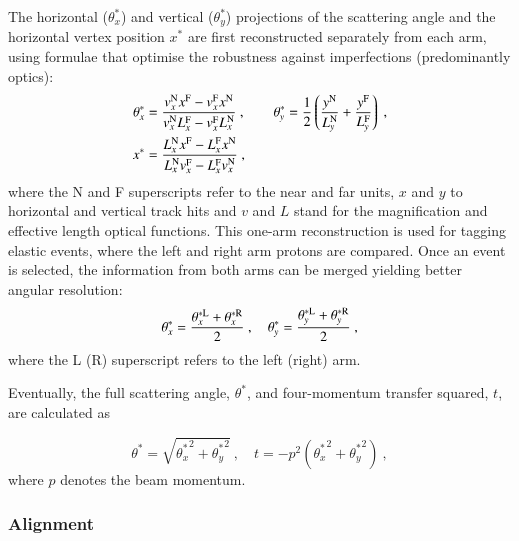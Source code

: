 The horizontal ($\theta_x^*$) and vertical ($\theta_y^*$) projections of the scattering angle and the horizontal vertex position $x^*$ are first reconstructed separately from each arm, using formulae that optimise the robustness against imperfections (predominantly optics):
\begin{equation}
\label{eq:kin 1a}
	\begin{aligned}
		\theta_x^* &= {v_x^{\rm N} x^{\rm F} - v_x^{\rm F} x^{\rm N}\over v_x^{\rm N} L_x^{\rm F} - v_x^{\rm F} L_x^{\rm N}}\ ,\qquad
		\theta_y^* = {1\over 2} \left( {y^{\rm N}\over L_y^{\rm N}} + {y^{\rm F}\over L_y^{\rm F}} \right)\ ,\\
		x^* &= {L_x^{\rm N} x^{\rm F} - L_x^{\rm F} x^{\rm N}\over L_x^{\rm N} v_x^{\rm F} - L_x^{\rm F} v_x^{\rm N}}\ , \\
	\end{aligned}
\end{equation}
where the N and F superscripts refer to the near and far units, $x$ and $y$ to horizontal and vertical track hits and $v$ and $L$ stand for the magnification and effective length optical functions. This one-arm reconstruction is used for tagging elastic events, where the left and right arm protons are compared. Once an event is selected, the information from both arms can be merged yielding better angular resolution:
\begin{equation}
\label{eq:kin 2a}
\theta_x^* = {\theta_x^{*\rm L} + \theta_x^{*\rm R} \over 2}\ ,\quad \theta_y^* = {\theta_y^{*\rm L} + \theta_y^{*\rm R} \over 2}\ ,
\end{equation}
where the L (R) superscript refers to the left (right) arm.

Eventually, the full scattering angle, $\theta^*$, and four-momentum transfer squared, $t$, are calculated as

\begin{equation}
\label{eq:th t}
\theta^* = \sqrt{{\theta_x^*}^2 + {\theta_y^*}^2}\ ,\quad t = - p^2 ({\theta_x^*}^2 + {\theta_y^*}^2)\ ,
\end{equation}
where $p$ denotes the beam momentum.


\subsubsection{Alignment}
\label{sec:alignment}


